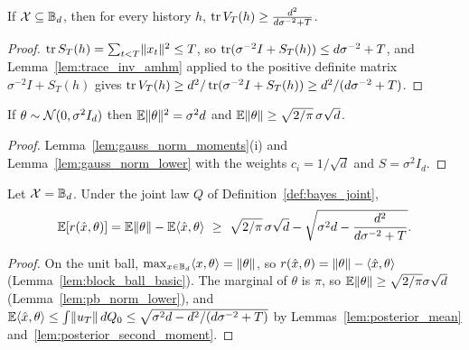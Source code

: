 \begin{lemma}\label{lem:trace_inv_lower}
\leanok
{}
If $\mathcal{X}\subseteq\mathbb{B}_d$, then for every history $h$, $\operatorname{tr} V_T(h)\ge\frac{d^2}{d\sigma^{-2}+T}$.
\end{lemma}

\begin{proof}
\leanok
{}
$\operatorname{tr} S_T(h) = \sum_{t<T}\lVert x_t \rVert^2\le T$, so $\operatorname{tr}(\sigma^{-2}I+S_T(h))\le d\sigma^{-2}+T$, and
Lemma~\ref{lem:trace_inv_amhm} applied to the positive definite matrix $\sigma^{-2}I+S_T(h)$
gives $\operatorname{tr} V_T(h)\ge d^2/\operatorname{tr}(\sigma^{-2}I+S_T(h))\ge d^2/(d\sigma^{-2}+T)$.
\end{proof}

\begin{lemma}\label{lem:pb_norm_lower}
\leanok
{}
If $\theta\sim\mathcal{N}(0,\sigma^2I_d)$ then $\mathbb{E}\lVert \theta \rVert^2 = \sigma^2d$ and
$\mathbb{E}\lVert \theta \rVert\ge\sqrt{2/\pi}\,\sigma\sqrt d$.
\end{lemma}

\begin{proof}
\leanok
{}
Lemma~\ref{lem:gauss_norm_moments}(i) and Lemma~\ref{lem:gauss_norm_lower} with the weights
$c_i = 1/\sqrt d$ and $S = \sigma^2I_d$.
\end{proof}

\begin{lemma}\label{lem:bayes_regret_ball}
\leanok
{}
Let $\mathcal{X} = \mathbb{B}_d$. Under the joint law $Q$ of Definition~\ref{def:bayes_joint},
\[
  \mathbb{E}[r(\hat{x},\theta)] = \mathbb{E}\lVert \theta \rVert-\mathbb{E}\langle \hat{x}, \theta \rangle
  \ \ge\ \sqrt{2/\pi}\,\sigma\sqrt d-\sqrt{\sigma^2d-\frac{d^2}{d\sigma^{-2}+T}} .
\]
\end{lemma}

\begin{proof}
\leanok
{}
On the unit ball, $\max_{x\in\mathbb{B}_d}\langle x, \theta \rangle = \lVert \theta \rVert$, so
$r(\hat{x},\theta) = \lVert \theta \rVert-\langle \hat{x}, \theta \rangle$ (Lemma~\ref{lem:block_ball_basic}). The marginal
of $\theta$ is $\pi$, so $\mathbb{E}\lVert \theta \rVert \ge \sqrt{2/\pi}\sigma\sqrt d$
(Lemma~\ref{lem:pb_norm_lower}), and
$\mathbb{E}\langle \hat{x}, \theta \rangle \le \int\lVert u_T \rVert\,dQ_0 \le \sqrt{\sigma^2d - d^2/(d\sigma^{-2}+T)}$
by Lemmas~\ref{lem:posterior_mean} and~\ref{lem:posterior_second_moment}.
\end{proof}

